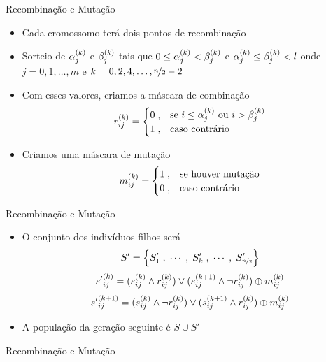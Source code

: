 \begin{frame}{Recombinação e Mutação}
  \begin{itemize}
    \item Cada cromossomo terá dois pontos de recombinação
    \item Sorteio de $ {\alpha}^{(k)}_{j} $ e $ {\beta}^{(k)}_{j} $ tais que
          $ 0 \leq {\alpha}^{(k)}_{j} < {\beta}^{(k)}_{j} $ e $ {\alpha}^{(k)}_{j} \leq {\beta}^{(k)}_{j} < l $ onde
          $ j = 0, 1, \dots, m $ e $ k = 0, 2, 4, \dots, \nicefrac{n}{2} - 2 $
    \item Com esses valores, criamos a máscara de combinação
          $$
            {r}^{(k)}_{ij} =
            \begin{cases}
              0 \;, & \text{se } i \leq {\alpha}^{(k)}_{j} \text{ ou } i > {\beta}^{(k)}_{j} \\
              1 \;, & \text{caso contrário}
            \end{cases}
          $$
    \item Criamos uma máscara de mutação
          $$
            {m}^{(k)}_{ij} =
            \begin{cases}
              1 \;, & \text{se houver mutação} \\
              0 \;, & \text{caso contrário}
            \end{cases}
          $$
  \end{itemize}
\end{frame}

\begin{frame}{Recombinação e Mutação}
  \begin{itemize}
    \item O conjunto dos indivíduos filhos será
          $$ S' = \left\{ S'_1\;, \;\cdots\;,  \;S'_k\;, \;\cdots\;, \;S'_{\nicefrac{n}{2}} \right\} $$
          $$ {s'}^{(k)}_{ij} = ({s}^{(k)}_{ij} \land {r}^{(k)}_{ij}) \lor ({s}^{(k + 1)}_{ij} \land \lnot {r}^{(k)}_{ij}) \oplus {m}^{(k)}_{ij} $$
          $$ {s'}^{(k + 1)}_{ij} = ({s}^{(k)}_{ij} \land \lnot {r}^{(k)}_{ij}) \lor ({s}^{(k + 1)}_{ij} \land {r}^{(k)}_{ij}) \oplus {m}^{(k)}_{ij} $$
    \item A população da geração seguinte é $ S \cup S' $
  \end{itemize}
\end{frame}

\begin{frame}{Recombinação e Mutação}
  
\end{frame}

